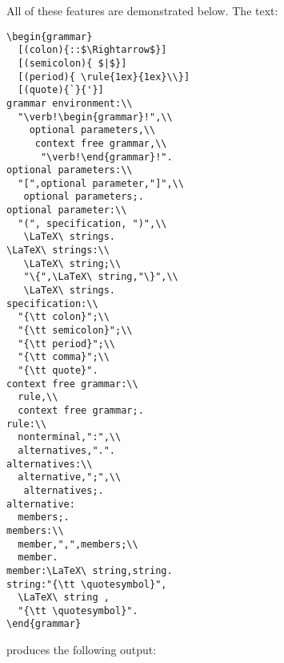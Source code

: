All of these features are demonstrated below. The text:
\begin{verbatim}
\begin{grammar}
  [(colon){::$\Rightarrow$}]
  [(semicolon){ $|$}]
  [(period){ \rule{1ex}{1ex}\\}]
  [(quote){`}{'}]
grammar environment:\\
  "\verb!\begin{grammar}!",\\
	optional parameters,\\
	 context free grammar,\\
	  "\verb!\end{grammar}!".
optional parameters:\\
  "[",optional parameter,"]",\\
   optional parameters;.
optional parameter:\\
  "(", specification, ")",\\
   \LaTeX\ strings.
\LaTeX\ strings:\\
   \LaTeX\ string;\\
   "\{",\LaTeX\ string,"\}",\\
   \LaTeX\ strings.
specification:\\
  "{\tt colon}";\\
  "{\tt semicolon}";\\
  "{\tt period}";\\
  "{\tt comma}";\\
  "{\tt quote}".
context free grammar:\\
  rule,\\
  context free grammar;.
rule:\\
  nonterminal,":",\\
  alternatives,".".
alternatives:\\
  alternative,";",\\
   alternatives;.
alternative:
  members;.
members:\\
  member,",",members;\\
  member.
member:\LaTeX\ string,string.
string:"{\tt \quotesymbol}",
  \LaTeX\ string ,
  "{\tt \quotesymbol}".
\end{grammar}
\end{verbatim}
produces the following output:
